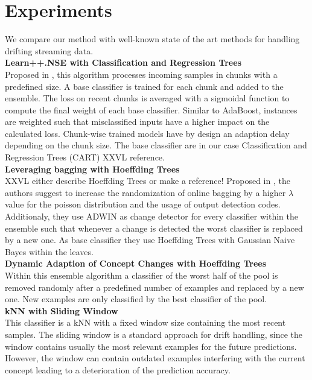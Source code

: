 \documentclass[conference]{IEEEtran}
\begin{document}
\section{Experiments}
We compare our method with well-known state of the art methods for handling drifting streaming data.
\\\textbf{Learn++.NSE with Classification and Regression Trees}\\
Proposed in \cite{5975223}, this algorithm processes incoming samples in chunks with a predefined size. A base classifier is trained for each chunk and added to the ensemble. The loss on recent chunks is averaged with a sigmoidal function
to compute the final weight of each base classifier. Similar to AdaBoost, instances are weighted such that misclassified inputs have a higher impact on the calculated loss.
Chunk-wise trained models have by design an adaption delay depending on the chunk size. The base classifier are in our case Classification and Regression Trees (CART) XXVL reference.
\\\textbf{Leveraging bagging with Hoeffding Trees}\\
XXVL either describe Hoeffding Trees or make a reference!
Proposed in \cite{bifet2010leveraging}, the authors suggest to increase the randomization of online bagging \cite{oza2005online} by a higher $\lambda$ value for the poisson distribution
and the usage of output detection codes. Additionaly, they use ADWIN as change detector for every classifier within the ensemble such that whenever a change is detected 
the worst classifier is replaced by a new one. As base classifier they use Hoeffding Trees with Gaussian Naive Bayes within the leaves. 
\\\textbf{Dynamic Adaption of Concept Changes with Hoeffding Trees}\\
Within this ensemble algorithm \cite{jaber2013online} a classifier of the worst half of the pool is removed randomly after a predefined number of examples and replaced by a new one. New examples are only
classified by the best classifier of the pool.
\\\textbf{kNN with Sliding Window}\\
This classifier is a kNN with a fixed window size containing the most recent samples. The sliding window is a standard approach for drift handling, since the window contains usually the most relevant examples
for the future predictions. However, the window can contain outdated examples interfering with the current concept leading to a deterioration of the prediction accuracy. 
\end{document}
